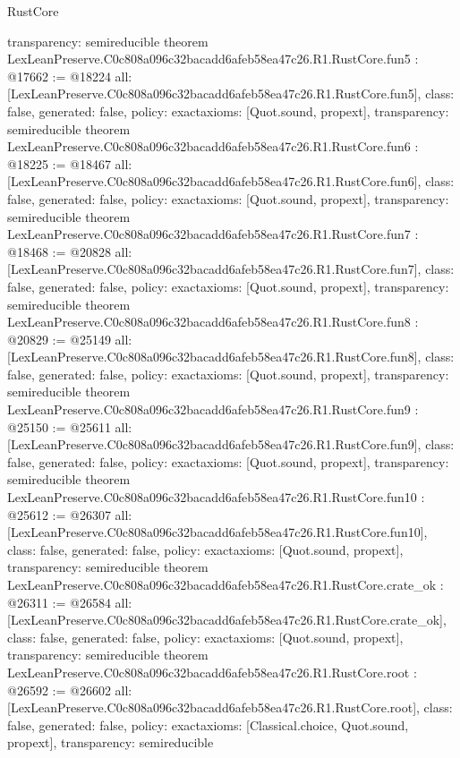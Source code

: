 \begin{lexlean}{RustCore}
\begin{coremodule}
{  transparency: semireducible
}
theorem LexLeanPreserve.C0c808a096c32bacadd6afeb58ea47c26.R1.RustCore.fun5 : @17662 := @18224 {
  all: [LexLeanPreserve.C0c808a096c32bacadd6afeb58ea47c26.R1.RustCore.fun5],
  class: false,
  generated: false,
  policy: exact{axioms: [Quot.sound, propext]},
  transparency: semireducible
}
theorem LexLeanPreserve.C0c808a096c32bacadd6afeb58ea47c26.R1.RustCore.fun6 : @18225 := @18467 {
  all: [LexLeanPreserve.C0c808a096c32bacadd6afeb58ea47c26.R1.RustCore.fun6],
  class: false,
  generated: false,
  policy: exact{axioms: [Quot.sound, propext]},
  transparency: semireducible
}
theorem LexLeanPreserve.C0c808a096c32bacadd6afeb58ea47c26.R1.RustCore.fun7 : @18468 := @20828 {
  all: [LexLeanPreserve.C0c808a096c32bacadd6afeb58ea47c26.R1.RustCore.fun7],
  class: false,
  generated: false,
  policy: exact{axioms: [Quot.sound, propext]},
  transparency: semireducible
}
theorem LexLeanPreserve.C0c808a096c32bacadd6afeb58ea47c26.R1.RustCore.fun8 : @20829 := @25149 {
  all: [LexLeanPreserve.C0c808a096c32bacadd6afeb58ea47c26.R1.RustCore.fun8],
  class: false,
  generated: false,
  policy: exact{axioms: [Quot.sound, propext]},
  transparency: semireducible
}
theorem LexLeanPreserve.C0c808a096c32bacadd6afeb58ea47c26.R1.RustCore.fun9 : @25150 := @25611 {
  all: [LexLeanPreserve.C0c808a096c32bacadd6afeb58ea47c26.R1.RustCore.fun9],
  class: false,
  generated: false,
  policy: exact{axioms: [Quot.sound, propext]},
  transparency: semireducible
}
theorem LexLeanPreserve.C0c808a096c32bacadd6afeb58ea47c26.R1.RustCore.fun10 : @25612 := @26307 {
  all: [LexLeanPreserve.C0c808a096c32bacadd6afeb58ea47c26.R1.RustCore.fun10],
  class: false,
  generated: false,
  policy: exact{axioms: [Quot.sound, propext]},
  transparency: semireducible
}
theorem LexLeanPreserve.C0c808a096c32bacadd6afeb58ea47c26.R1.RustCore.crate_ok : @26311 := @26584 {
  all: [LexLeanPreserve.C0c808a096c32bacadd6afeb58ea47c26.R1.RustCore.crate_ok],
  class: false,
  generated: false,
  policy: exact{axioms: [Quot.sound, propext]},
  transparency: semireducible
}
theorem LexLeanPreserve.C0c808a096c32bacadd6afeb58ea47c26.R1.RustCore.root : @26592 := @26602 {
  all: [LexLeanPreserve.C0c808a096c32bacadd6afeb58ea47c26.R1.RustCore.root],
  class: false,
  generated: false,
  policy: exact{axioms: [Classical.choice, Quot.sound, propext]},
  transparency: semireducible
}


\end{coremodule}
\end{lexlean}
